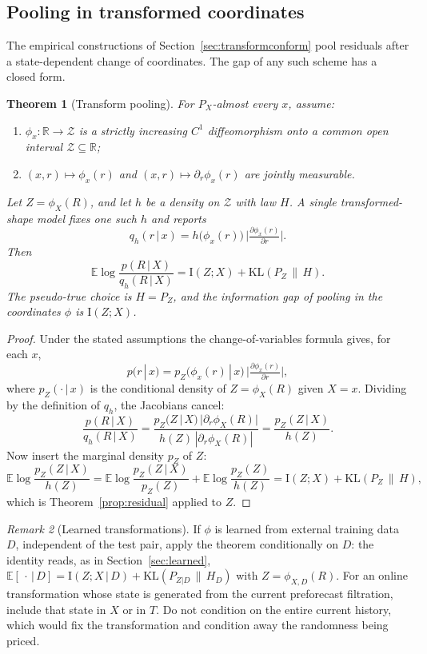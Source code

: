 \documentclass[11pt]{article}
\newtheorem{theorem}{Theorem}
\theoremstyle{remark}
\newtheorem{remark}[theorem]{Remark}
\newcommand{\E}{\mathbb{E}}
\newcommand{\KL}{\mathrm{KL}}
\newcommand{\I}{\mathrm{I}}
\newcommand{\given}{\,|\,}
\begin{document}
\subsection{Pooling in transformed coordinates}\label{sec:transformpool}

The empirical constructions of Section~\ref{sec:transformconform} pool residuals after a
state-dependent change of coordinates. The gap of any such scheme has a closed form.

\begin{theorem}[Transform pooling]\label{thm:transformpool}
For $P_X$-almost every $x$, assume:
\begin{enumerate}
\item $\phi_x:\mathbb R\to\mathcal Z$ is a strictly increasing $C^1$ diffeomorphism onto
a common open interval $\mathcal Z\subseteq\mathbb R$;
\item $(x,r)\mapsto\phi_x(r)$ and $(x,r)\mapsto\partial_r\phi_x(r)$ are jointly
measurable.
\end{enumerate}
Let $Z=\phi_X(R)$, and let $h$ be a density on $\mathcal Z$ with law $H$. A \emph{single
transformed-shape model} fixes one such $h$ and reports
\[
q_h(r\given x)=h\big(\phi_x(r)\big)\,\Big|\tfrac{\partial\phi_x(r)}{\partial r}\Big| .
\]
Then
\begin{equation}\label{eq:transformpool}
\E\log\frac{p(R\given X)}{q_h(R\given X)}=\I(Z;X)+\KL(P_Z\,\|\,H).
\end{equation}
The pseudo-true choice is $H=P_Z$, and the information gap of pooling in the coordinates
$\phi$ is $\I(Z;X)$.
\end{theorem}

\begin{proof}
Under the stated assumptions the change-of-variables formula gives, for each $x$,
\[
p(r\given x)=p_Z\big(\phi_x(r)\given x\big)\,\Big|\tfrac{\partial\phi_x(r)}{\partial r}\Big|,
\]
where $p_Z(\cdot\given x)$ is the conditional density of $Z=\phi_X(R)$ given $X=x$.
Dividing by the definition of $q_h$, the Jacobians cancel:
\[
\frac{p(R\given X)}{q_h(R\given X)}
=\frac{p_Z(Z\given X)\,|\partial_r\phi_X(R)|}{h(Z)\,|\partial_r\phi_X(R)|}
=\frac{p_Z(Z\given X)}{h(Z)}.
\]
Now insert the marginal density $p_Z$ of $Z$:
\[
\E\log\frac{p_Z(Z\given X)}{h(Z)}
=\E\log\frac{p_Z(Z\given X)}{p_Z(Z)}+\E\log\frac{p_Z(Z)}{h(Z)}
=\I(Z;X)+\KL(P_Z\,\|\,H),
\]
which is Theorem~\ref{prop:residual} applied to $Z$.
\end{proof}

\begin{remark}[Learned transformations]
If $\phi$ is learned from external training data $D$, independent of the test pair, apply
the theorem conditionally on $D$: the identity reads, as in Section~\ref{sec:learned},
$\E[\,\cdot\given D]=\I(Z;X\given D)+\KL(P_{Z|D}\,\|\,H_{D})$ with
$Z=\phi_{X,D}(R)$. For an online transformation whose state is generated from the current
preforecast filtration, include that state in $X$ or in $T$. Do not condition on the
entire
current history, which would fix the transformation and condition away the randomness being
priced.
\end{remark}
\end{document}
